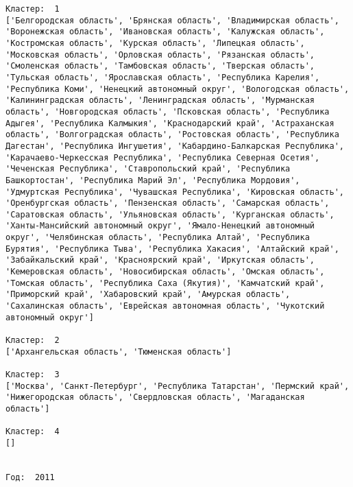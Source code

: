 \documentclass[11pt]{article}
\begin{document}
\begin{Verbatim}[commandchars=\\\{\}]
Кластер:  1
['Белгородская область', 'Брянская область', 'Владимирская область', 'Воронежская область', 'Ивановская область', 'Калужская область', 'Костромская область', 'Курская область', 'Липецкая область', 'Московская область', 'Орловская область', 'Рязанская область', 'Смоленская область', 'Тамбовская область', 'Тверская область', 'Тульская область', 'Ярославская область', 'Республика Карелия', 'Республика Коми', 'Ненецкий автономный округ', 'Вологодская область', 'Калинингpадская область', 'Ленинградская область', 'Мурманская область', 'Новгородская область', 'Псковская область', 'Республика Адыгея', 'Республика Калмыкия', 'Краснодарский край', 'Астраханская область', 'Волгоградская область', 'Ростовская область', 'Республика Дагестан', 'Республика Ингушетия', 'Кабардино-Балкарская Республика', 'Карачаево-Черкесская Республика', 'Республика Северная Осетия', 'Чеченская Республика', 'Ставропольский край', 'Республика Башкортостан', 'Республика Марий Эл', 'Республика Мордовия', 'Удмуртская Республика', 'Чувашская Республика', 'Кировская область', 'Оренбургская область', 'Пензенская область', 'Самарская область', 'Саратовская область', 'Ульяновская область', 'Курганская область', 'Ханты-Мансийский автономный округ', 'Ямало-Ненецкий автономный округ', 'Челябинская область', 'Республика Алтай', 'Республика Бурятия', 'Республика Тыва', 'Республика Хакасия', 'Алтайский край', 'Забайкальский край', 'Красноярский край', 'Иркутская область', 'Кемеровская область', 'Новосибирская область', 'Омская область', 'Томская область', 'Республика Саха (Якутия)', 'Камчатский край', 'Приморский край', 'Хабаровский край', 'Амурская область', 'Сахалинская область', 'Еврейская автономная область', 'Чукотский автономный округ']

Кластер:  2
['Архангельская область', 'Тюменская область']

Кластер:  3
['Москва', 'Санкт-Петербург', 'Республика Татарстан', 'Пермский край', 'Нижегородская область', 'Свердловская область', 'Магаданская область']

Кластер:  4
[]


Год:  2011


\end{Verbatim}
\end{document}
